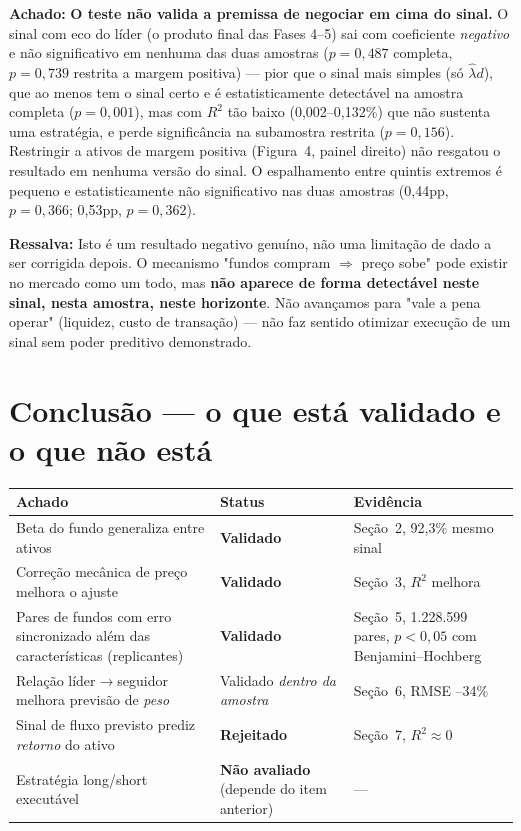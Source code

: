 \documentclass[11pt,a4paper]{article}
\newcommand{\aha}[1]{\par\vspace{4pt}\noindent\textbf{\color{vermelho}Achado:} #1\par\vspace{2pt}}
\newcommand{\ressalva}[1]{\par\vspace{4pt}\noindent\textbf{\color{verde}Ressalva:} #1\par\vspace{2pt}}
\begin{document}
\aha{\textbf{O teste não valida a premissa de negociar em cima do sinal.} O sinal com eco do
líder (o produto final das Fases 4--5) sai com coeficiente \emph{negativo} e não significativo em
nenhuma das duas amostras ($p=0{,}487$ completa, $p=0{,}739$ restrita a margem positiva) --- pior
que o sinal mais simples (só $\hat\lambda d$), que ao menos tem o sinal certo e é
estatisticamente detectável na amostra completa ($p=0{,}001$), mas com $R^2$ tão baixo
(0,002--0,132\%) que não sustenta uma estratégia, e perde significância na subamostra restrita
($p=0{,}156$). Restringir a ativos de margem positiva (Figura~4, painel direito) não resgatou o
resultado em nenhuma versão do sinal. O espalhamento entre quintis extremos é pequeno e
estatisticamente não significativo nas duas amostras (0,44pp, $p=0{,}366$; 0,53pp,
$p=0{,}362$).}

\ressalva{Isto é um resultado negativo genuíno, não uma limitação de dado a ser corrigida
depois. O mecanismo "fundos compram $\Rightarrow$ preço sobe" pode existir no mercado como um
todo, mas \textbf{não aparece de forma detectável neste sinal, nesta amostra, neste
horizonte}. Não avançamos para "vale a pena operar" (liquidez, custo de transação) --- não faz
sentido otimizar execução de um sinal sem poder preditivo demonstrado.}

\section{Conclusão --- o que está validado e o que não está}

\begin{center}\small
\begin{tabular}{p{6.5cm}p{3.2cm}p{4.5cm}}
\toprule
\textbf{Achado} & \textbf{Status} & \textbf{Evidência} \\
\midrule
Beta do fundo generaliza entre ativos & \textbf{Validado} & Seção~2, 92,3\% mesmo sinal \\
Correção mecânica de preço melhora o ajuste & \textbf{Validado} & Seção~3, $R^2$ melhora \\
Pares de fundos com erro sincronizado além das características (replicantes) & \textbf{Validado} & Seção~5, 1.228.599 pares, $p<0{,}05$ com Benjamini--Hochberg \\
Relação líder$\to$seguidor melhora previsão de \emph{peso} & Validado \emph{dentro da amostra} & Seção~6, RMSE --34\% \\
Sinal de fluxo previsto prediz \emph{retorno} do ativo & \textbf{Rejeitado} & Seção~7, $R^2\approx$0 \\
Estratégia long/short executável & \textbf{Não avaliado} (depende do item anterior) & --- \\
\bottomrule
\end{tabular}
\end{center}
\end{document}
